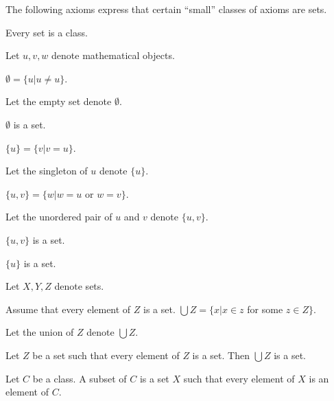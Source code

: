 \documentclass[11pt]{article}
\begin{document}
The following axioms express that certain ``small'' classes of axioms are sets.

\newcommand{\sing}[1]{\{#1\}}
\newcommand{\unp}[2]{\{#1,#2\}}

\begin{forthel}

\begin{proposition} Every set is a class. \end{proposition}

Let $u,v,w$ denote mathematical objects.

\begin{definition} $\emptyset = \{u | u \neq u\}$.
\end{definition}
Let the empty set denote $\emptyset$.

\begin{axiom}[title = Set Existence] $\emptyset$ is a set. \end{axiom}

\begin{definition}
$\sing{u} = \{v | v = u\}$.
\end{definition}
Let the singleton of $u$ denote $\sing{u}$.


\begin{definition}
$\unp{u}{v} = \{w | w = u$ or $w = v\}$.
\end{definition}
Let the unordered pair of $u$ and $v$ denote $\unp{u}{v}$.

\begin{axiom}[title = Pairs]
$\unp{u}{v}$ is a set.
\end{axiom}

\begin{lemma}
$\sing{u}$ is a set.
\end{lemma}

Let $X,Y,Z$ denote sets.

\begin{definition} Assume that every element of $Z$ is a set.
$\bigcup Z = \{x | x \in z$ for some $z \in Z\}$.
\end{definition}
Let the union of $Z$ denote $\bigcup Z$.

\begin{axiom}[title = Union] 
Let $Z$ be a set such that every element of $Z$ is a set.
Then $\bigcup Z$ is a set.
\end{axiom}

\begin{definition} Let $C$ be a class. A subset of $C$ is a set $X$ such
that every element of $X$ is an element of $C$.
\end{definition}


\end{forthel}
\end{document}
